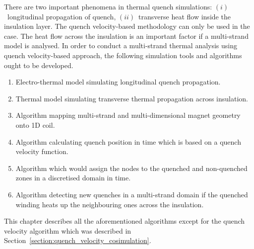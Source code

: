 
There are two important phenomena in thermal quench simulations: $(i)$~longitudinal propagation of quench, $(ii)$~transverse heat flow inside the insulation layer. The quench velocity-based methodology can only be used in the  case. The heat flow across the insulation is an important factor if a multi-strand model is analysed. In order to conduct a multi-strand thermal analysis using quench velocity-based approach, the following simulation tools and algorithms ought to be developed.

\begin{enumerate}
\item Electro-thermal model simulating longitudinal quench propagation.
\item Thermal model simulating transverse thermal propagation across insulation.
\item Algorithm mapping multi-strand and multi-dimensional magnet geometry onto 1D coil.
\item Algorithm calculating quench position in time which is based on a quench velocity function.
\item Algorithm which would assign the nodes to the quenched and non-quenched zones in a discretised domain in time.
\item Algorithm detecting new quenches in a multi-strand domain if the quenched winding heats up the neighbouring ones across the insulation.
\end{enumerate}

This chapter describes all the aforementioned algorithms except for the quench velocity algorithm which was described in Section~\ref{section:quench_velocity_cosimulation}.